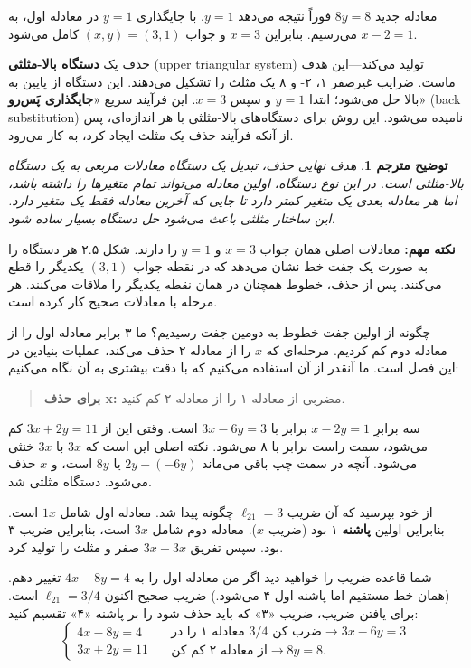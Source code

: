 \documentclass[12pt, a4paper]{book}
\theoremstyle{translator}
\newtheorem*{translator}{توضیح مترجم}
\begin{document}
	معادله جدید $8y=8$ فوراً نتیجه می‌دهد $y=1$. با جایگذاری $y=1$ در معادله اول، به $x - 2 = 1$ می‌رسیم. بنابراین $x=3$ و جواب $(x, y) = (3, 1)$ کامل می‌شود.
	
	حذف یک \textbf{دستگاه بالا-مثلثی} (upper triangular system) تولید می‌کند—این هدف ماست. ضرایب غیرصفر ۱، ۲- و ۸ یک مثلث را تشکیل می‌دهند. این دستگاه از پایین به بالا حل می‌شود؛ ابتدا $y=1$ و سپس $x=3$. این فرآیند سریع «\textbf{جایگذاری پَس‌رو}» (back substitution) نامیده می‌شود. این روش برای دستگاه‌های بالا-مثلثی با هر اندازه‌ای، پس از آنکه فرآیند حذف یک مثلث ایجاد کرد، به کار می‌رود.
	
	\begin{translator}
		هدف نهایی حذف، تبدیل یک دستگاه معادلات مربعی به یک دستگاه بالا-مثلثی است. در این نوع دستگاه، اولین معادله می‌تواند تمام متغیرها را داشته باشد، اما هر معادله بعدی یک متغیر کمتر دارد تا جایی که آخرین معادله فقط یک متغیر دارد. این ساختار مثلثی باعث می‌شود حل دستگاه بسیار ساده شود.
	\end{translator}
	
	\textbf{نکته مهم:} معادلات اصلی همان جواب $x=3$ و $y=1$ را دارند. شکل ۲.۵ هر دستگاه را به صورت یک جفت خط نشان می‌دهد که در نقطه جواب $(3,1)$ یکدیگر را قطع می‌کنند. پس از حذف، خطوط همچنان در همان نقطه یکدیگر را ملاقات می‌کنند. هر مرحله با معادلات صحیح کار کرده است.
	
	چگونه از اولین جفت خطوط به دومین جفت رسیدیم؟ ما ۳ برابر معادله اول را از معادله دوم کم کردیم. مرحله‌ای که $x$ را از معادله ۲ حذف می‌کند، عملیات بنیادین در این فصل است. ما آنقدر از آن استفاده می‌کنیم که با دقت بیشتری به آن نگاه می‌کنیم:
	
	\begin{quote}
		\textbf{برای حذف x:} مضربی از معادله ۱ را از معادله ۲ کم کنید.
	\end{quote}
	
	سه برابرِ $x - 2y = 1$ برابر با $3x - 6y = 3$ است. وقتی این از $3x + 2y = 11$ کم می‌شود، سمت راست برابر با ۸ می‌شود. نکته اصلی این است که $3x$ با $3x$ خنثی می‌شود. آنچه در سمت چپ باقی می‌ماند $2y - (-6y)$ یا $8y$ است، و $x$ حذف می‌شود. دستگاه مثلثی شد.
	
	از خود بپرسید که آن ضریب $\ell_{21} = 3$ چگونه پیدا شد. معادله اول شامل $1x$ است. بنابراین اولین \textbf{پاشنه} ۱ بود (ضریب $x$). معادله دوم شامل $3x$ است، بنابراین ضریب ۳ بود. سپس تفریق $3x-3x$ صفر و مثلث را تولید کرد.
	
	شما قاعده ضریب را خواهید دید اگر من معادله اول را به $4x - 8y = 4$ تغییر دهم. (همان خط مستقیم اما پاشنه اول ۴ می‌شود.) ضریب صحیح اکنون $\ell_{21} = 3/4$ است. برای یافتن ضریب، ضریب «۳» که باید حذف شود را بر پاشنه «۴» تقسیم کنید:
	\[
	\begin{cases}
		4x - 8y = 4 \\
		3x + 2y = 11
	\end{cases}
	\quad
	\begin{array}{l}
		\text{معادله ۱ را در } 3/4 \text{ ضرب کن} \rightarrow 3x - 6y = 3 \\
		\text{از معادله ۲ کم کن} \rightarrow 8y = 8.
	\end{array}
	\]
	
\end{document}
